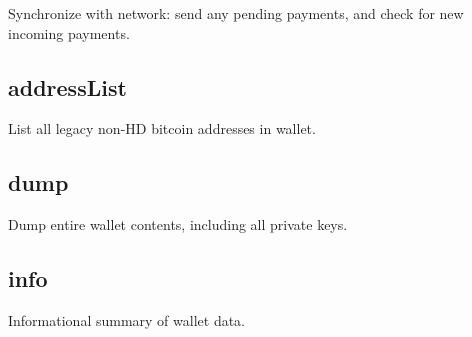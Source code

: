 Synchronize with network\-: send any pending payments, and check for new incoming payments.

\subsection*{address\-List }

List all legacy non-\/\-H\-D bitcoin addresses in wallet.

\subsection*{dump }

Dump entire wallet contents, including all private keys.

\subsection*{info }

Informational summary of wallet data. 